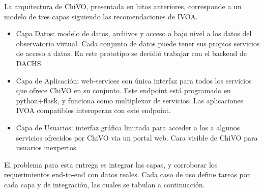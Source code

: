 La arquitectura de ChiVO, presentada en hitos anteriores, corresponde
a un modelo de tres capas siguiendo las recomendaciones de IVOA.

\begin{itemize}
\item Capa Datos: modelo de datos, archivos y acceso a bajo nivel 
a los datos del observatorio virtual. Cada conjunto de datos puede
tener sus propios servicios de acceso a datos. En este prototipo
se decidió trabajar con el backend de DACHS.
\item Capa de Aplicación: web-services con única interfaz para todos
los servicios que ofrece ChiVO en su conjunto. Este endpoint está programado en
python+flask, y funciona como multiplexor de servicios. Las aplicaciones
IVOA compatibles interoperan con este endpoint.
\item Capa de Usuarios: interfaz gráfica limitada para acceder a los
a algunos servicios ofrecidos por ChiVO via un portal web. Cara visible
de ChiVO para usuarios inexpertos.
\end{itemize}

El problema para esta entrega es integrar las capas, y corroborar
los requerimientos end-to-end con datos reales. Cada caso de uso
define tareas por cada capa y de integración, las cuales se tabulan 
a continuación.


